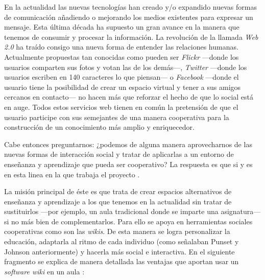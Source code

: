 En la actualidad las nuevas tecnologías han creado y/o expandido nuevas formas de comunicación añadiendo o mejorando los medios existentes para expresar un mensaje. Esta última década ha supuesto un gran avance en la manera que tenemos de consumir y procesar la información. La revolución de la llamada \textit{Web 2.0} \cite{paper:innovamos} ha traído consigo una nueva forma de entender las relaciones humanas. Actualmente propuestas tan conocidas como pueden ser \textit{Flickr} \cite{web:flickr} ---donde los usuarios comparten sus fotos y votan las de los demás---, \textit{Twitter} \cite{web:twitter} ---donde los usuarios escriben en 140 caracteres lo que piensan--- o \textit{Facebook} \cite{web:facebook} ---donde el usuario tiene la posibilidad de crear un espacio virtual y tener a sus amigos cercanos en contacto--- no hacen más que reforzar el hecho de que lo social está en auge. Todos estos servicios web tienen en común la pretensión de que el usuario participe con sus semejantes de una manera cooperativa para la construcción de un conocimiento más amplio y enriquecedor.

Cabe entonces preguntarnos: ¿podemos de alguna manera aprovecharnos de las nuevas formas de interacción social y tratar de aplicarlas a un entorno de enseñanza y aprendizaje que pueda ser cooperativo? La respuesta es que si y es en esta linea en la que trabaja el proyecto \alma{}. 

La misión principal de éste es que trata de crear espacios alternativos de enseñanza y aprendizaje a los que tenemos en la actualidad sin tratar de sustituirlos  ---por ejemplo, un aula tradicional donde se imparte una asignatura--- si no más bien de complementarlos. Para ello se apoya en herramientas sociales cooperativas como son las \textit{wikis}. De esta manera se logra personalizar la educación, adaptarla al ritmo de cada individuo (como señalaban Punset y Johnson anteriormente) y hacerla más social e interactiva. En el siguiente fragmento se explica de manera detallada las ventajas que aportan usar un \textit{software wiki} en un aula \cite[pág.~4]{paper:innovamos}:


